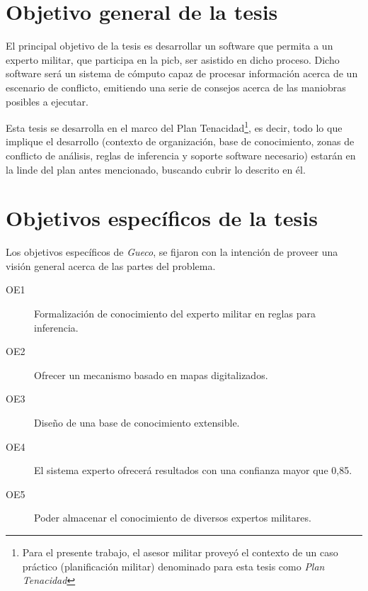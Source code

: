 
\section{Objetivo general de la tesis}


El principal objetivo de la tesis es desarrollar un software que permita a un experto militar, que participa en la \gls{picb}, ser asistido en dicho proceso. Dicho software será un sistema de cómputo capaz de procesar información acerca de un escenario de conflicto, emitiendo una serie de consejos acerca de las maniobras posibles a ejecutar.

Esta tesis se desarrolla en el marco del Plan Tenacidad\footnote{Para el presente trabajo, el asesor militar proveyó el contexto de un caso práctico (planificación militar) denominado para esta tesis como \emph{Plan Tenacidad}}, es decir, todo lo que implique el desarrollo (contexto de organización, base de conocimiento, zonas de conflicto de análisis, reglas de inferencia y soporte software necesario) estarán en la linde del plan antes mencionado, buscando cubrir lo descrito en él.



\section{Objetivos específicos de la tesis}

Los objetivos específicos de \emph{Gueco}, se fijaron con la intención de proveer una visión general acerca de las partes del problema.

\begin{description}
  \item[OE1] Formalización de conocimiento del experto militar en reglas para inferencia.
  \item[OE2] Ofrecer un mecanismo basado en mapas digitalizados.
  \item[OE3] Diseño de una base de conocimiento extensible.
  \item[OE4] El sistema experto ofrecerá resultados con una confianza mayor que 0,85.
  \item[OE5] Poder almacenar el conocimiento de diversos expertos militares.
\end{description}


